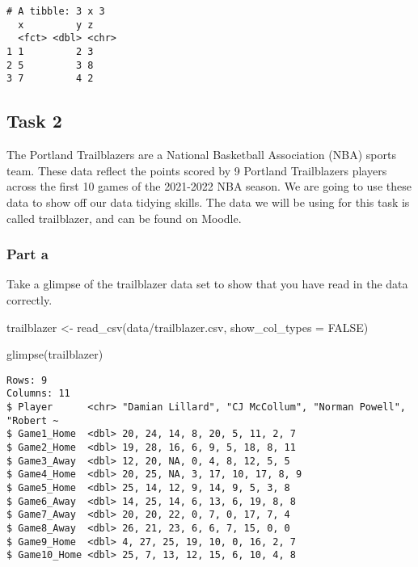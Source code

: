 \documentclass[
  letterpaper,
  DIV=11,
  numbers=noendperiod]{scrartcl}
\newenvironment{Shaded}{\begin{snugshade}}{\end{snugshade}}
\newcommand{\AttributeTok}[1]{\textcolor[rgb]{0.40,0.45,0.13}{#1}}
\newcommand{\ConstantTok}[1]{\textcolor[rgb]{0.56,0.35,0.01}{#1}}
\newcommand{\FunctionTok}[1]{\textcolor[rgb]{0.28,0.35,0.67}{#1}}
\newcommand{\NormalTok}[1]{\textcolor[rgb]{0.00,0.23,0.31}{#1}}
\newcommand{\OtherTok}[1]{\textcolor[rgb]{0.00,0.23,0.31}{#1}}
\newcommand{\StringTok}[1]{\textcolor[rgb]{0.13,0.47,0.30}{#1}}
\begin{document}
\begin{verbatim}
# A tibble: 3 x 3
  x         y z    
  <fct> <dbl> <chr>
1 1         2 3    
2 5         3 8    
3 7         4 2    
\end{verbatim}

\subsection{Task 2}\label{task-2}

The Portland Trailblazers are a National Basketball Association (NBA)
sports team. These data reflect the points scored by 9 Portland
Trailblazers players across the first 10 games of the 2021-2022 NBA
season. We are going to use these data to show off our data tidying
skills. The data we will be using for this task is called trailblazer,
and can be found on Moodle.

\subsubsection{Part a}\label{part-a-1}

Take a glimpse of the trailblazer data set to show that you have read in
the data correctly.

\begin{Shaded}
\begin{Highlighting}[]
\NormalTok{trailblazer }\OtherTok{\textless{}{-}} \FunctionTok{read\_csv}\NormalTok{(}\StringTok{\textquotesingle{}data/trailblazer.csv\textquotesingle{}}\NormalTok{, }\AttributeTok{show\_col\_types =} \ConstantTok{FALSE}\NormalTok{)}

\FunctionTok{glimpse}\NormalTok{(trailblazer)}
\end{Highlighting}
\end{Shaded}

\begin{verbatim}
Rows: 9
Columns: 11
$ Player      <chr> "Damian Lillard", "CJ McCollum", "Norman Powell", "Robert ~
$ Game1_Home  <dbl> 20, 24, 14, 8, 20, 5, 11, 2, 7
$ Game2_Home  <dbl> 19, 28, 16, 6, 9, 5, 18, 8, 11
$ Game3_Away  <dbl> 12, 20, NA, 0, 4, 8, 12, 5, 5
$ Game4_Home  <dbl> 20, 25, NA, 3, 17, 10, 17, 8, 9
$ Game5_Home  <dbl> 25, 14, 12, 9, 14, 9, 5, 3, 8
$ Game6_Away  <dbl> 14, 25, 14, 6, 13, 6, 19, 8, 8
$ Game7_Away  <dbl> 20, 20, 22, 0, 7, 0, 17, 7, 4
$ Game8_Away  <dbl> 26, 21, 23, 6, 6, 7, 15, 0, 0
$ Game9_Home  <dbl> 4, 27, 25, 19, 10, 0, 16, 2, 7
$ Game10_Home <dbl> 25, 7, 13, 12, 15, 6, 10, 4, 8
\end{verbatim}
\end{document}
